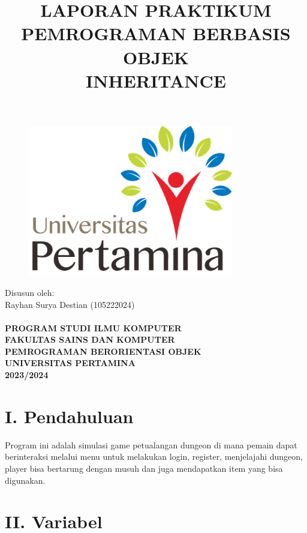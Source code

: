 \documentclass{article}
\title{
  \textbf{LAPORAN PRAKTIKUM}\\
  \textbf{PEMROGRAMAN BERBASIS OBJEK}\\
  \textbf{INHERITANCE}
}
\author{} %
\date{} %
\begin{document}
\maketitle

\begin{figure}[h]
    \centering
    \includegraphics[width=0.8\textwidth]{Logo_Universitas_Pertamina.png}
\end{figure}

\begin{center}
\fontsize{14pt}{16pt}\selectfont Disusun oleh:\\
\fontsize{14pt}{16pt}\selectfont Rayhan Surya Destian (105222024)\\
\Large \textbf{ }\\
\Large \textbf{PROGRAM STUDI ILMU KOMPUTER}\\
\Large \textbf{FAKULTAS SAINS DAN KOMPUTER}\\
\Large \textbf{PEMROGRAMAN BERORIENTASI OBJEK}\\
\Large \textbf{UNIVERSITAS PERTAMINA}\\
\Large \textbf{2023/2024}
\end{center}

\newpage

\section*{I. Pendahuluan}
Program ini adalah simulasi game petualangan dungeon di mana pemain dapat berinteraksi melalui menu untuk melakukan login, register, menjelajahi dungeon, player bisa bertarung dengan musuh dan juga mendapatkan item yang bisa digunakan.

\section*{II. Variabel}
\end{document}
